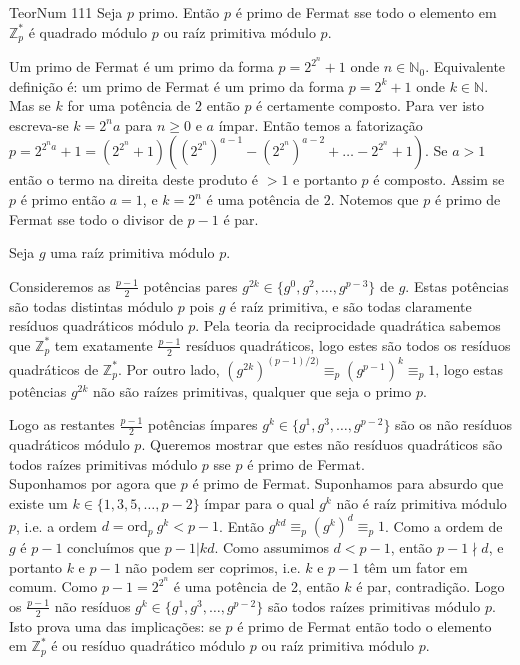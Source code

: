 \documentclass[main.tex]{subfiles}
\renewcommand*{\ord}[1]{\ensuremath{\text{ord}_#1\:}}
\begin{document}
\begin{problem}{TeorNum 111}
Seja $p$ primo. Então $p$ é primo de Fermat sse todo o elemento
em $\mathbb{Z}_p^*$ é quadrado módulo $p$ ou raíz primitiva módulo $p$.
\end{problem}

\begin{solution}
\begin{smallnote}
Um primo de Fermat é um primo da forma $p=2^{2^n}+1$ onde $n\in\mathbb{N}_0$.
Equivalente definição é: um primo de Fermat é um primo da forma $p=2^k+1$ onde $k\in\mathbb{N}$.
Mas se $k$ for uma potência de $2$ então $p$ é certamente composto. Para ver isto escreva-se $k=2^na$ para $n\geq 0$ e $a$ ímpar.
Então temos a fatorização
$p=2^{2^na}+1=(2^{2^n}+1)((2^{2^n})^{a-1}-(2^{2^n})^{a-2}+\dots-2^{2^n}+1)$.
Se $a>1$ então o termo na direita deste produto é $>1$ e portanto $p$ é composto.
Assim se $p$ é primo então $a=1$, e $k=2^n$ é uma potência de $2$. Notemos que $p$ é primo de Fermat sse todo o divisor de $p-1$ é par.
\end{smallnote}

Seja $g$ uma raíz primitiva módulo $p$.

Consideremos as $\frac{p-1}{2}$ potências pares
$g^{2k}\in\{g^0,g^2,\dots,g^{p-3}\}$ de $g$.
Estas potências são todas distintas módulo $p$ pois $g$ é raíz primitiva,
e são todas claramente resíduos quadráticos módulo $p$.
Pela teoria da reciprocidade quadrática sabemos que $\mathbb{Z}_p^*$ tem
exatamente $\frac{p-1}{2}$ resíduos quadráticos, logo estes são todos os
resíduos quadráticos de $\mathbb{Z}_p^*$. Por outro lado,
$(g^{2k})^{(p-1)/2)}\equiv_p (g^{p-1})^k\equiv_p 1$, logo estas potências
$g^{2k}$ não são raízes primitivas, qualquer que seja o primo $p$.

Logo as restantes $\frac{p-1}{2}$ potências ímpares
$g^k\in\{g^1,g^3,\dots,g^{p-2}\}$ são os não resíduos quadráticos módulo $p$.
Queremos mostrar que estes não resíduos quadráticos são todos raízes
primitivas módulo $p$ sse $p$ é primo de Fermat.
\\

Suponhamos por agora que $p$ é primo de Fermat.
Suponhamos para absurdo que existe um $k\in\{1,3,5,\dots,p-2\}$ ímpar para o
qual $g^k$ não é raíz primitiva módulo $p$, i.e. a ordem $d=\ord{p}g^k<p-1$.
Então $g^{kd}\equiv_p(g^k)^d\equiv_p 1$.
Como a ordem de $g$ é $p-1$ concluímos que $p-1|kd$.
Como assumimos $d<p-1$, então $p-1\nmid d$, e portanto $k$ e $p-1$ não
podem ser coprimos, i.e. $k$ e $p-1$ têm um fator em comum.
Como $p-1=2^{2^n}$ é uma potência de 2, então $k$ é par, contradição.
Logo os $\frac{p-1}{2}$ não resíduos $g^k\in\{g^1,g^3,\dots,g^{p-2}\}$
são todos raízes primitivas módulo $p$.
Isto prova uma das implicações: se $p$ é primo de Fermat então todo o
elemento em $\mathbb{Z}_p^*$ é ou resíduo quadrático módulo $p$ ou raíz
primitiva módulo $p$.
\\


\end{solution}
\end{document}
